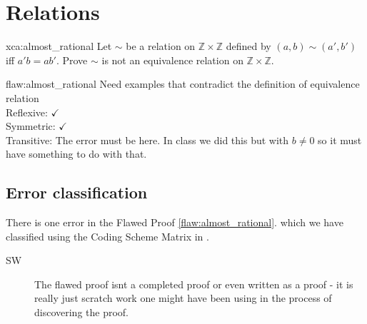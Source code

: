 \section{Relations}

\begin{xca}{xca:almost_rational}
Let $\sim$ be a relation on $\mathbb{Z} \times \mathbb{Z}$ defined by $(a,b) \sim (a',b')$ iff $a'b = ab'$. Prove $\sim$ is not an equivalence relation on $\mathbb{Z} \times \mathbb{Z}$. 
\end{xca}

\begin{flaw}{flaw:almost_rational} %
Need examples that contradict the definition of equivalence relation\\

Reflexive: $\checkmark$\\

Symmetric: $\checkmark$\\

Transitive: The error must be here. In class we did this but with $b \neq 0$ so it must have something to do with that. 


\end{flaw}

\clearpage
\subsection{Error classification}


There is one error
 in the Flawed Proof \ref{flaw:almost_rational}. %
 which we have classified using  the Coding Scheme Matrix in \cite[pp.~919]{Strickland_2016}. %
 
 \begin{description}
    \item[SW] The flawed proof isnt a completed proof or even written as a proof - it is really just scratch work one might have been using in the process of discovering the proof. 

 	
 \end{description}

